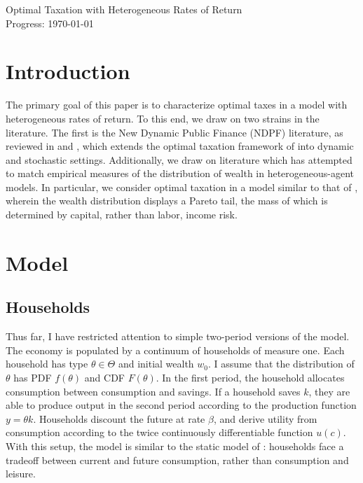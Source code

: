 \documentclass[11pt]{article}
\begin{document}
    \begin{flushleft}
        Optimal Taxation with Heterogeneous Rates of Return \\
        Progress: \today
    \end{flushleft}

\section{Introduction}
The primary goal of this paper is to characterize optimal taxes in a model with heterogeneous rates of return. To this end, we draw on two strains in the literature. The first is the New Dynamic Public Finance (NDPF) literature, as reviewed in \cite{golosov2006new} and \cite{kocherlakota2010new}, which extends the optimal taxation framework of \cite{mirrlees1971exploration} into dynamic and stochastic settings. Additionally, we draw on literature which has attempted to match empirical measures of the distribution of wealth in heterogeneous-agent models. In particular, we consider optimal taxation in a model similar to that of \cite{benhabib2011distribution}, wherein the wealth distribution displays a Pareto tail, the mass of which is determined by capital, rather than labor, income risk. 

\section{Model}
\subsection{Households}
Thus far, I have restricted attention to simple two-period versions of the model. The economy is populated by a continuum of households of measure one. Each household has type \( \theta\in\Theta \) and initial wealth \( w_0 \). I assume that the distribution of \( \theta \) has PDF \( f(\theta) \) and CDF \( F(\theta) \). In the first period, the household allocates consumption between consumption and savings. If a household saves \( k \), they are able to produce output in the second period according to the production function \( y = \theta k \). Households discount the future at rate \( \beta \), and derive utility from consumption according to the twice continuously differentiable function \( u(c) \). With this setup, the model is similar to the static model of \cite{mirrlees1971exploration}: households face a tradeoff between current and future consumption, rather than consumption and leisure. 
\end{document}
